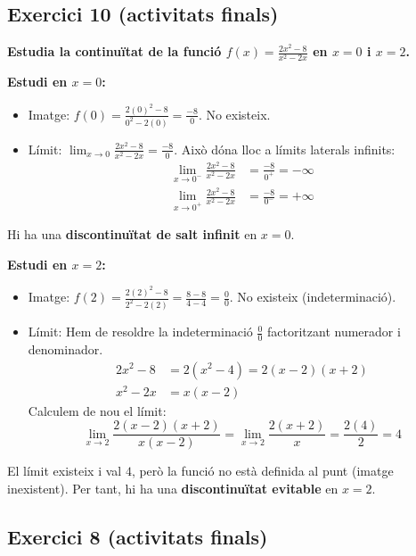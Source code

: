 \documentclass[12pt,a4paper]{article}
\begin{document}
\vspace{0.5cm}

\subsection{Exercici 10 (activitats finals)}

\textbf{Estudia la continuïtat de la funció $f(x) = \frac{2x^2-8}{x^2-2x}$ en $x=0$ i $x=2$.}

\textbf{Estudi en $x=0$:}
\begin{itemize}
    \item Imatge: $f(0) = \frac{2(0)^2-8}{0^2-2(0)} = \frac{-8}{0}$. No existeix.
    \item Límit: $\lim_{x \to 0} \frac{2x^2-8}{x^2-2x} = \frac{-8}{0}$. Això dóna lloc a límits laterals infinits:
    \begin{align*}
        \lim_{x \to 0^-} \frac{2x^2-8}{x^2-2x} &= \frac{-8}{0^+} = -\infty \\
        \lim_{x \to 0^+} \frac{2x^2-8}{x^2-2x} &= \frac{-8}{0^-} = +\infty
    \end{align*}
\end{itemize}
Hi ha una \textbf{discontinuïtat de salt infinit} en $x=0$.

\textbf{Estudi en $x=2$:}
\begin{itemize}
    \item Imatge: $f(2) = \frac{2(2)^2-8}{2^2-2(2)} = \frac{8-8}{4-4} = \frac{0}{0}$. No existeix (indeterminació).
    \item Límit: Hem de resoldre la indeterminació $\frac{0}{0}$ factoritzant numerador i denominador.
    \begin{align*}
        2x^2-8 &= 2(x^2-4) = 2(x-2)(x+2) \\
        x^2-2x &= x(x-2)
    \end{align*}
    Calculem de nou el límit:
    \[ \lim_{x \to 2} \frac{2(x-2)(x+2)}{x(x-2)} = \lim_{x \to 2} \frac{2(x+2)}{x} = \frac{2(4)}{2} = 4 \]
\end{itemize}
El límit existeix i val $4$, però la funció no està definida al punt (imatge inexistent). Per tant, hi ha una \textbf{discontinuïtat evitable} en $x=2$.

\vspace{0.5cm}

\subsection{Exercici 8 (activitats finals)}
\end{document}
